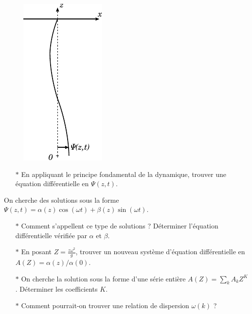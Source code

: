 \documentclass{report}
\begin{document}
\begin{figure}[h!]
\centering
	\includegraphics[scale=1.5]{onde4.pdf}
\end{figure}


\begin{itemize}

	\item[$\ast$] En appliquant le principe fondamental de la dynamique, trouver une équation différentielle en  $\Psi(z,t)$.

\end{itemize}

On cherche des solutions sous la forme $\Psi(z,t)=\alpha(z)\cos(\omega t)+\beta(z)\sin(\omega t)$. 

\begin{itemize}
	
		\item[$\ast$] Comment s'appellent ce type de solutions ? Déterminer l'équation différentielle vérifiée par $\alpha$ et $\beta$.
		
		\item[$\ast$] En posant $Z=\frac{z\omega^2}{g}$, trouver un nouveau système d'équation différentielle en $A(Z)=\alpha(z)/\alpha(0)$. 
		
		\item[$\ast$] On cherche la solution sous la forme d'une série entière $A(Z)=\sum_k A_k Z^K$. Déterminer les coefficients $K$. 
		
		\item[$\ast$] Comment pourrait-on trouver une relation de dispersion $\omega(k)$ ?
		
\end{itemize}

\newpage
\end{document}
